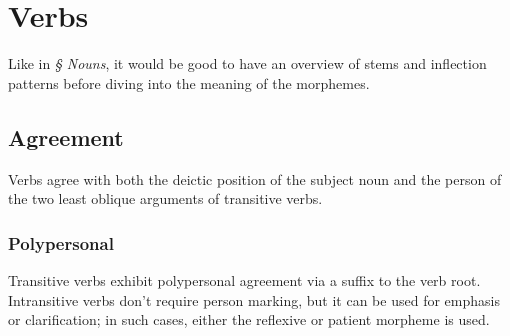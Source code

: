 \setchapterpreamble[u]{\margintoc}
\chapter{Verbs}

\begin{kaobox}[frametitle=\sc todo:]
    Like in \emph{§ Nouns}, it would be good to have an overview of stems and inflection patterns before diving into the meaning of the morphemes.
\end{kaobox}

\section{Agreement}
Verbs agree with both the deictic position of the subject noun and the person of the two least oblique arguments of transitive verbs.

\subsection{Polypersonal}
Transitive verbs exhibit polypersonal agreement via a suffix to the verb root. Intransitive verbs don't require person marking, but it can be used for emphasis or clarification; in such cases, either the reflexive or  patient morpheme is used.


